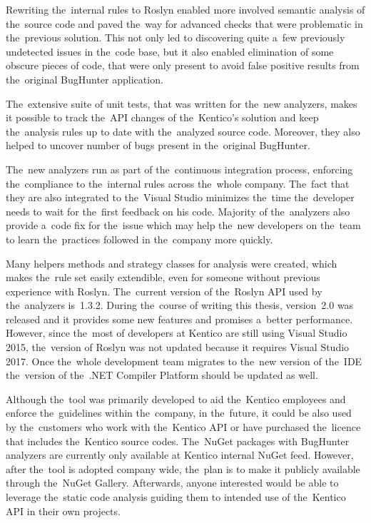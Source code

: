 \documentclass[
  digital, %
  table,   %
  lof,     %
  lot,     %
  oneside,
]{fithesis3}
\begin{document}
Rewriting the~internal rules to Roslyn enabled more involved semantic analysis of the~source code and paved the~way for advanced checks that were problematic in the~previous solution. This not only led to discovering quite a~few previously undetected issues in the~code base, but it also enabled elimination of some obscure pieces of code, that were only present to avoid false positive results from the~original BugHunter application. 

The~extensive suite of unit tests, that was written for the~new analyzers, makes it possible to track the~API changes of the~Kentico's solution and keep the~analysis rules up to date with the~analyzed source code. Moreover, they also helped to uncover number of bugs present in the~original BugHunter.

The~new analyzers run as part of the~continuous integration process, enforcing the~compliance to the~internal rules across the~whole company. The~fact that they are also integrated to the~Visual Studio minimizes the~time the~developer needs to wait for the~first feedback on his code. Majority of the~analyzers also provide a~code fix for the~issue which may help the~new developers on the~team to learn the~practices followed in the~company more quickly.

Many helpers methods and strategy classes for analysis were created, which makes the~rule set easily extendible, even for someone without previous experience with Roslyn. The~current version of the~Roslyn API used by the~analyzers is~1.3.2. During the~course of writing this thesis, version~2.0 was released and it provides some new features and promises a~better performance. However, since the~most of developers at Kentico are still using Visual Studio 2015, the~version of Roslyn was not updated because it requires Visual Studio 2017. Once the~whole development team migrates to the~new version of the~IDE the~version of the~.NET Compiler Platform should be updated as well.

Although the~tool was primarily developed to aid the~Kentico employees and enforce the~guidelines within the~company, in the~future, it could be also used by the~customers who work with the~Kentico API or have purchased the~licence that includes the~Kentico source codes. The~NuGet packages with BugHunter analyzers are currently only available at Kentico internal NuGet feed. However, after the~tool is adopted company wide, the~plan is to make it publicly available through the~NuGet Gallery. Afterwards, anyone interested would be able to leverage the~static code analysis guiding them to intended use of the~Kentico API in their own projects.
\end{document}
